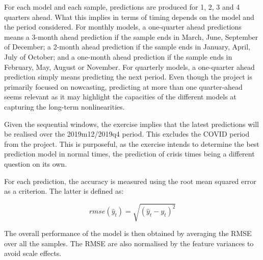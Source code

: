 For each model and each sample, predictions are produced for 1, 2, 3 and 4 quarters ahead. What this implies in terms of timing depends on the model and the period considered. For monthly models, a one-quarter ahead predictions means a 3-month ahead prediction if the sample ends in March, June, September of December; a 2-month ahead prediction if the sample ends in January, April, July of October; and a one-month ahead prediction if the sample ends in February, May, August or November. For quarterly models, a one-quarter ahead prediction simply means predicting the next period. Even though the project is primarily focused on nowcasting, predicting at more than one quarter-ahead seems relevant as it may highlight the capacities of the different models at capturing the long-term nonlinearities.

Given the sequential windows, the exercise implies that the latest predictions will be realised over the 2019m12/2019q4 period. This excludes the COVID period from the project. This is purposeful, as the exercise intends to determine the best prediction model in normal times, the prediction of crisis times being a different question on its own.

For each prediction, the accuracy is measured using the root mean squared error as a criterion. The latter is defined as:

\begin{equation}
rmse(\hat{y}_t) = \sqrt{(\hat{y}_t - y_t)^2}
\label{equation_c4_s1_ss1_1}
\end{equation}

The overall performance of the model is then obtained by averaging the RMSE over all the samples. The RMSE are also normalised by the feature variances to avoid scale effects.





